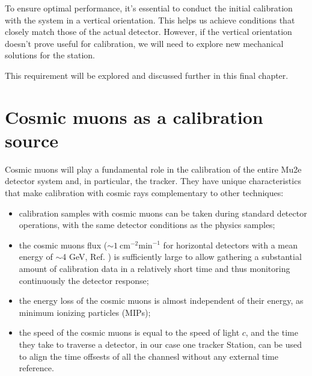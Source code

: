 To ensure optimal performance, it's essential to conduct the initial calibration with the system in a vertical orientation. 
This helps us achieve conditions that closely match those of the actual detector. However, if the vertical 
orientation doesn't prove useful for calibration, we will need to explore new mechanical solutions for the station.

This requirement will be explored and discussed further in this final chapter.

\section{Cosmic muons as a calibration source}
Cosmic muons will play a fundamental role in the 
calibration of the entire Mu2e detector system and, 
in particular, the tracker. They have unique 
characteristics that make calibration with cosmic rays 
complementary to other techniques:

 

\begin{itemize}
    \item calibration samples with cosmic muons 
    can be taken during standard detector operations, 
    with the same detector conditions as the physics samples;
    \item the cosmic muons flux 
    ($\sim 1 \ \text{cm}^{-2} \text{min}^{-1}$ 
    for horizontal detectors with a mean
    energy of $\sim$4 GeV, Ref. \cite{muonflux}) is sufficiently 
    large to allow gathering a substantial amount of 
    calibration data in a relatively short time and 
    thus monitoring continuously the detector response;
    \item the energy loss of the cosmic muons is almost 
    independent of their energy, as minimum ionizing particles (MIPs);
    \item the speed of the cosmic muons is equal to the 
    speed of light $c$, and the time they take to traverse 
    a detector, in our case one tracker Station, can be 
    used to align the time offsests of all the channesl 
    without any external time reference.
\end{itemize}
